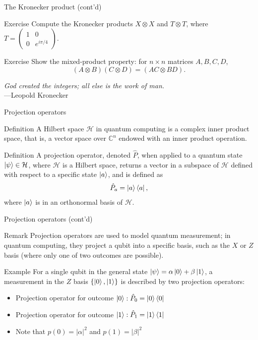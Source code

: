 \documentclass{beamer}
\newcommand{\C}{\mathbb{C}}
\renewcommand{\H}{\mathcal{H}}
\begin{document}
\begin{frame}{The Kronecker product (cont'd)}
    \begin{block}{Exercise}
        Compute the Kronecker products $X\otimes X$ and $T\otimes T$, where $T=\begin{pmatrix}
            1 & 0 \\ 0 & e^{i\pi/4}
        \end{pmatrix}$.
    \end{block}
	\begin{block}{Exercise}
		Show the mixed-product property: for $n\times n$ matrices $A, B, C, D$, $$ (A \otimes B)(C \otimes D) = (AC \otimes BD). $$
	\end{block}
	 \begin{flushright}
          \textit{God created the integers; all else is the work of man.}\\---Leopold Kronecker
        \end{flushright}
\end{frame}

\begin{frame}{Projection operators}
    \begin{block}{Definition}
A Hilbert space $\mathcal H$ in quantum computing is a complex inner product space, that is, a vector space over $\C^n$ endowed with an inner product operation.
\end{block}
    \begin{block}{Definition}
        A projection operator, denoted $\hat P$, when applied to a quantum state $\ket\psi \in \H$, where $\H$ is a Hilbert space, returns a vector in a subspace of $\H$ defined with respect to a specific state $\ket a$, and is defined as $$ \hat P_a = \ket a\bra{a}, $$ where $\ket a$ is in an orthonormal basis of $\H$.
    \end{block}
\end{frame}

\begin{frame}{Projection operators (cont'd)}
	    \begin{block}{Remark}
        Projection operators are used to model quantum measurement; in quantum computing, they project a qubit into a specific basis, such as the $X$ or $Z$ basis (where only one of two outcomes are possible).
    \end{block}

    \begin{block}{Example}
        For a single qubit in the general state $\ket\psi=\alpha\ket0 + \beta\ket1$, a measurement in the $Z$ basis $\{\ket0,\ket1\}$ is described by two projection operators:
        \begin{itemize}
            \item Projection operator for outcome $\ket 0: \hat P_0 = \ket 0\bra0$
            \item Projection operator for outcome $\ket 1: \hat P_1 = \ket1\bra1$
            \item  Note that $p(0) = |\alpha|^2$ and  $p(1) = |\beta|^2$
        \end{itemize}
    \end{block}

\end{frame}
\end{document}
